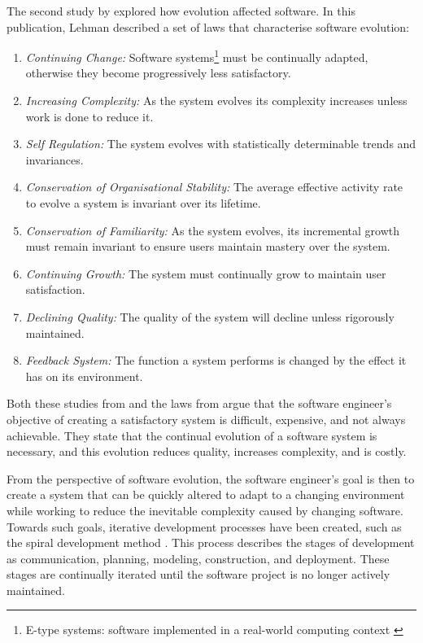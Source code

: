 The second study by \cite{lehman1980} explored how evolution affected software.
In this publication, Lehman described a set of laws that characterise software evolution:
\begin{enumerate}
  \item \textit{Continuing Change:} Software systems\footnote{E-type systems: software implemented in a real-world computing context \citep{lehman1980}} must be continually adapted, 
  otherwise they become progressively less satisfactory.
  \item \textit{Increasing Complexity:} As the system evolves its complexity increases unless work is done to reduce it.
  \item \textit{Self Regulation:} The system evolves with statistically determinable trends and invariances.
  \item \textit{Conservation of Organisational Stability:} The average effective activity rate to evolve a system is invariant over its lifetime.
  \item \textit{Conservation of Familiarity:} As the system evolves, its incremental growth must remain invariant to ensure users maintain mastery over the system.
  \item \textit{Continuing Growth:} The system must continually grow to maintain user satisfaction.
  \item \textit{Declining Quality:} The quality of the system will decline unless rigorously maintained.
  \item \textit{Feedback System:} The function a system performs is changed by the effect it has on its environment.
\end{enumerate}

Both these studies from \cite{Lientz1980} and the laws from \citep{lehman1980} argue that
the software engineer's objective of creating a satisfactory system is difficult, expensive, and not always achievable.
They state that the continual evolution of a software system is necessary, and this evolution reduces quality, increases complexity, and is costly.

From the perspective of software evolution, the software engineer's goal is then to create a system that can be quickly altered to adapt to a changing environment 
while working to reduce the inevitable complexity caused by changing software.
Towards such goals, iterative development processes have been created, such as the spiral development method \citep{Boehm1988}.
This process describes the stages of development as communication, planning, modeling, construction, and deployment. 
These stages are continually iterated until the software project is no longer actively maintained. 

